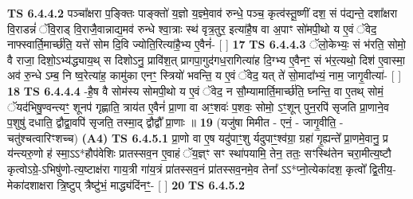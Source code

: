 \documentclass[17pt]{extarticle}
\begin{document}
                  \newline
                                \textbf{ TS 6.4.4.2} \newline
                  पञ्चा᳚क्षरा प॒ङ्क्तिः पाङ्क्तो॑ य॒ज्ञो य॒ज्ञ्मे॒वाव॑ रुन्धे॒ पञ्च॒ कृत्व॑स्तू॒ष्णीं दश॒ सं प॑द्यन्ते॒ दशा᳚क्षरा वि॒राडन्नं॑ ॅवि॒राड् वि॒राजै॒वान्नाद्य॒मव॑ रुन्धे श्वा॒त्राः स्थ॑ वृत्र॒तुर॒ इत्या॑है॒ष वा अ॒पाꣳ सो॑मपी॒थो य ए॒वं ॅवेद॒ नाफ्स्वार्ति॒मार्च्छ॑ति॒ यत्ते॑ सोम दि॒वि ज्योति॒रित्या॑है॒भ्य ए॒वैनं॑- [  ] \textbf{  17} \newline
                  \newline
                                \textbf{ TS 6.4.4.3} \newline
                  ॅलो॒केभ्यः॒ सं भ॑रति॒ सोमो॒ वै राजा॒ दिशो॒ऽभ्य॑द्ध्याय॒थ् स दिशोऽनु॒ प्रावि॑श॒त् प्रागपा॒गुद॑गध॒रागित्या॑ह दि॒ग्भ्य ए॒वैनꣳ॒॒ सं भ॑र॒त्यथो॒ दिश॑ ए॒वास्मा॒ अव॑ रु॒न्धे ऽम्ब॒ नि ष्व॒रेत्या॑ह॒ कामु॑का एनꣳ॒॒ स्त्रियो॑ भवन्ति॒ य ए॒वं ॅवेद॒ यत् ते॑ सो॒मादा᳚भ्यं॒ नाम॒ जागृ॒वीत्या॑- [  ] \textbf{  18} \newline
                  \newline
                                \textbf{ TS 6.4.4.4} \newline
                  -है॒ष वै सोम॑स्य सोमपी॒थो य ए॒वं ॅवेद॒ न सौ॒म्यामार्ति॒मार्च्छ॑ति॒ घ्नन्ति॒ वा ए॒तथ् सोमं॒ ॅयद॑भिषु॒ण्वन्त्यꣳ॒॒ शूनप॑ गृह्णाति॒ त्राय॑त ए॒वैनं॑ प्रा॒णा वा अꣳ॒॒शवः॑ प॒शवः॒ सोमो॒ ऽꣳ॒शून् पुन॒रपि॑ सृजति प्रा॒णाने॒व प॒शुषु॑ दधाति॒ द्वौद्वा॒वपि॑ सृजति॒ तस्मा॒द् द्वौद्वौ᳚ प्रा॒णाः ॥ \textbf{  19} \newline
                  \newline
                      (यजु॑षा मिमीत - एनं॒ - जागृ॒वीति॒ - चतु॑श्चत्वारिꣳशच्च)  \textbf{(A4)} \newline \newline
                                        \textbf{ TS 6.4.5.1} \newline
                  प्रा॒णो वा ए॒ष यदु॑पाꣳ॒॒शु र्यदुपाꣳ॒॒श्व॑ग्रा॒ ग्रहा॑ गृ॒ह्यन्ते᳚ प्रा॒णमे॒वानु॒ प्र य॑न्त्यरु॒णो ह॑ स्मा॒ऽऽ*हौप॑वेशिः प्रातस्सव॒न ए॒वाहं ॅय॒ज्ञ्ꣳ सꣳ स्था॑पयामि॒ तेन॒ ततः॒ सꣳस्थि॑तेन चरा॒मीत्य॒ष्टौ कृत्वोऽग्रे॒-ऽभिषु॑णो-त्य॒ष्टाक्ष॑रा गाय॒त्री गा॑य॒त्रं प्रा॑तस्सव॒नं प्रा॑तस्सव॒नमे॒व तेना᳚ ऽऽ*प्नो॒त्येका॑दश॒ कृत्वो᳚ द्वि॒तीय॒-मेका॑दशाक्षरा त्रि॒ष्टुप् त्रैष्टु॑भं॒ माद्ध्य॑दिंनꣳ॒॒- [  ] \textbf{  20} \newline
                  \newline
                                \textbf{ TS 6.4.5.2} \newline
\end{document}
